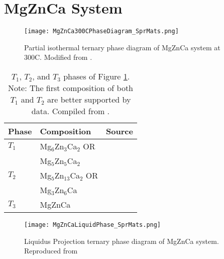\documentclass[draft,a4paper,12pt,oneside]{report}%
\begin{document}
\newpage

\section{MgZnCa System}

\begin{figure}[htbp]
	\centering
	\texttt{[image: MgZnCa300CPhaseDiagram\_SprMats.png]}
	\caption[MgZnCa Isothermal Ternary Phase Diagram]{Partial isothermal ternary phase diagram of MgZnCa system at 300\degree C. Modified from \cite{Melnik1978}.}
	\label{fig:MgZnCa300PhaseD}
\end{figure}

\begin{table}[h]
	\centering
	\begin{tabular}{ l l l }
		\toprule
		Phase & Composition & Source \\
		\midrule
		$T_{1}$ & Mg$_{6}$Zn$_{3}$Ca$_{2}$ OR & \cite{Clark1961} \\
		& Mg$_{5}$Zn$_{5}$Ca$_{2}$ & \\
		$T_{2}$	& Mg$_{5}$Zn$_{13}$Ca$_{2}$ OR & \cite{Clark1961} \\
		& Mg$_{3}$Zn$_{6}$Ca & \\
		$T_{3}$	& MgZnCa & \cite{Schulze1961} \\
		\bottomrule
	\end{tabular}
	\caption[MgZnCa Ternary Phases]{$T_{1}$, $T_{2}$, and $T_{3}$ phases of Figure \ref{fig:MgZnCa300PhaseD}. Note: The first composition of both $T_{1}$ and $T_{2}$ are better supported by data. Compiled from \cite{Clark1961, Schulze1961}.}
	\label{tab:SputterParameters}
\end{table}

\begin{figure}[htbp]
	\centering
	\texttt{[image: MgZnCaLiquidPhase\_SprMats.png]}
	\caption[MgZnCa Liquidus Ternary Phase Diagram]{Liquidus Projection ternary phase diagram of MgZnCa system. Reproduced from \cite{Paris1933}}
	\label{fig:MgZnCaLiquidPhaseD}
\end{figure}
\end{document}
